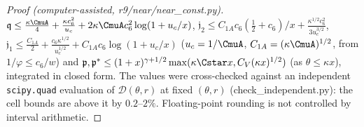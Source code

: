 \begin{proof}[Proof (computer-assisted, r9/near/near\_const.py)]
$\mathfrak q\le\frac{\kappa\CmuA}4+\frac{\kappa c_6^2}{u_c}+2\kappa\CmuA c_6^2\log(1+u_c/x)$,
$\mathfrak j_2\le C_{1A}c_6(\frac12+c_6)/x+\frac{\kappa^{1/2}c_6^2}{3u_c^{3/2}}$,
$\mathfrak j_1\le\frac{C_{1A}}2+\frac{c_6\kappa^{1/2}}{u_c^{1/2}}+C_{1A}c_6\log(1+u_c/x)$ ($u_c=1/\CmuA$, $C_{1A}=(\kappa\CmuA)^{1/2}$,
from $1/\varphi\le c_6/w$) and $\mathfrak p,\mathfrak p^*\le(1+x)^{\gamma+1/2}\max(\kappa\Cstar x,C_V(\kappa x)^{1/2})$ (as $\theta\le\kappa x$),
integrated in closed form. The values were cross-checked against an independent \texttt{scipy.quad} evaluation of
$\mathcal D(\theta,r)$ at fixed $(\theta,r)$ (check\_independent.py): the cell bounds are above it by $0.2$--$2\%$.
Floating-point rounding is not controlled by interval arithmetic.
\end{proof}
